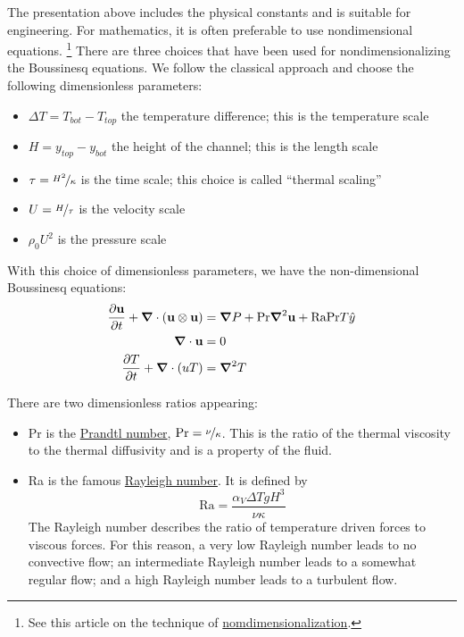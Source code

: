 \documentclass[11pt]{article} %
\newcommand{\uu}{\vectorbold{u}}
\newcommand{\Laplace}{\Delta}
\begin{document}
The presentation above includes the physical constants and is suitable for engineering.
For mathematics, it is often preferable to use nondimensional equations.
\footnote{See this article on the technique of \href{https://en.wikipedia.org/wiki/Nondimensionalization}{nomdimensionalization}.}
There are three choices that have been used for nondimensionalizing the Boussinesq equations.
We follow the classical approach and choose the following dimensionless parameters:
\begin{itemize}
\item{$\Delta T = T_{bot} - T_{top}$} the temperature difference; this is the temperature scale
\item{$H=y_{top} - y_{bot}$} the height of the channel; this is the length scale
\item{$\tau = \nicefrac{H^2}{\kappa}$} is the time scale; this choice is called ``thermal scaling''
\item{$U = \nicefrac{H}{\tau}$} is the velocity scale
\item{$\rho_0 U^2$} is the pressure scale
\end{itemize}

With this choice of dimensionless parameters, we have the non-dimensional Boussinesq equations:
\begin{align}
\frac{\partial \uu}{\partial t} + \grad \cdot (\uu \otimes \uu) &= \grad P + \textrm{Pr} \grad^2 \uu + \textrm{RaPr}T \hat{y} \\
\grad \cdot \uu &= 0 \\
\frac{\partial T}{\partial t} + \grad \cdot (uT) &=  \grad^2 T
\end{align}

There are two dimensionless ratios appearing:
\begin{itemize}
\item{Pr} is the \href{https://en.wikipedia.org/wiki/Prandtl_number}{Prandtl number}, $\textrm{Pr} = \nicefrac{\nu}{\kappa}$.  
This is the ratio of the thermal viscosity to the thermal diffusivity and is a property of the fluid.
\item{Ra} is the famous \href{https://en.wikipedia.org/wiki/Rayleigh_number}{Rayleigh number}.  It is defined by
$$\textrm{Ra} = \frac{\alpha_V \Laplace T g H^3}{\nu \kappa}$$
The Rayleigh number describes the ratio of temperature driven forces to viscous forces.
For this reason, a very low Rayleigh number leads to no convective flow; 
an intermediate Rayleigh number leads to a somewhat regular flow;
and a high Rayleigh number leads to a turbulent flow.
\end{itemize}
\end{document}
